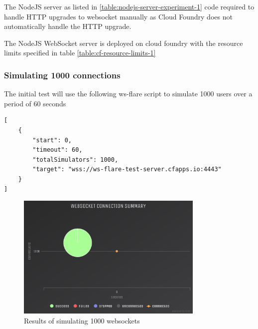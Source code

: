 The NodeJS server as listed in \ref{table:nodejs-server-experiment-1} code required to handle HTTP upgrades to websocket manually as Cloud Foundry does not automatically handle the HTTP upgrade.

The NodeJS WebSocket server is deployed on cloud foundry with the resource limits specified in table \ref{table:cf-resource-limits-1}

\begin{table}[H]
\caption{Cloud Foundry Resource Limits}
\label{table:cf-resource-limits-1}
\end{table}

\subsubsection{Simulating 1000 connections}
The initial test will use the following ws-flare script to simulate 1000 users over a period of 60 seconds

\begin{listing}[H]
    \caption{WS-Flare test script for 1000 users}
    \label{table:nodejs-server-experiment-1}
    \begin{verbatim}
[
    {
        "start": 0,
        "timeout": 60,
        "totalSimulators": 1000,
        "target": "wss://ws-flare-test-server.cfapps.io:4443"
    }
]
\end{verbatim}
\end{listing}

\begin{figure}[H]
  \centering
    \includegraphics[width=0.8\textwidth]{figures/experiments/experiment-1/node-js/conn-summary-1000.png}
    \caption{Results of simulating 1000 websockets}
    \label{fig:experiment-1-node-conn-summary-1000}
\end{figure}

